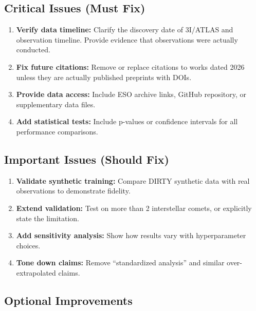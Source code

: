 \documentclass[12pt,a4paper]{article}
\newcommand{\critical}[1]{\textcolor{CriticalRed}{\textbf{#1}}}
\newcommand{\warning}[1]{\textcolor{WarningOrange}{\textbf{#1}}}
\begin{document}
\subsection{Critical Issues (Must Fix)}

\begin{enumerate}[label=\textbf{C\arabic*:}]
    \item \critical{Verify data timeline:} Clarify the discovery date of 3I/ATLAS and observation timeline. Provide evidence that observations were actually conducted.

    \item \critical{Fix future citations:} Remove or replace citations to works dated 2026 unless they are actually published preprints with DOIs.

    \item \critical{Provide data access:} Include ESO archive links, GitHub repository, or supplementary data files.

    \item \critical{Add statistical tests:} Include p-values or confidence intervals for all performance comparisons.
\end{enumerate}

\subsection{Important Issues (Should Fix)}

\begin{enumerate}[label=\textbf{I\arabic*:}]
    \item \warning{Validate synthetic training:} Compare DIRTY synthetic data with real observations to demonstrate fidelity.

    \item \warning{Extend validation:} Test on more than 2 interstellar comets, or explicitly state the limitation.

    \item \warning{Add sensitivity analysis:} Show how results vary with hyperparameter choices.

    \item \warning{Tone down claims:} Remove ``standardized analysis'' and similar over-extrapolated claims.
\end{enumerate}

\subsection{Optional Improvements}
\end{document}
